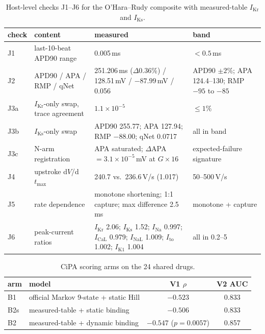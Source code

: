 \documentclass[11pt,a4paper]{article}
\begin{document}
\begin{table}[htbp]\centering\small
\caption{Host-level checks J1--J6 for the O'Hara--Rudy composite with
measured-table $I_{\mathrm{Kr}}$ and $I_{\mathrm{Ks}}$.}
\label{tab:hostchecks}
\begin{tabular}{@{}p{2.2cm}p{4.4cm}p{5.6cm}p{3.4cm}@{}}
\toprule
check & content & measured & band \\
\midrule
J1 & last-10-beat APD90 range & 0.005\,ms & $<0.5$\,ms \\
J2 & APD90 / APA / RMP / qNet & 251.206\,ms ($\Delta$0.36\%) / 128.51\,mV / $-87.99$\,mV / 0.056 & APD90 $\pm2$\%; APA 124.4--130; RMP $-95$ to $-85$ \\
J3a & $I_{\mathrm{Kr}}$-only swap, trace agreement & $1.1\times10^{-5}$ & $\le1$\% \\
J3b & $I_{\mathrm{Ks}}$-only swap & APD90 255.77; APA 127.94; RMP $-88.00$; qNet 0.0717 & all in band \\
J3c & N-arm registration & APA saturated; $\Delta$APA $=3.1\times10^{-5}$\,mV at $G\times16$ & expected-failure signature \\
J4 & upstroke d$V$/d$t_{\max}$ & 240.7 vs.\ 236.6\,V/s (1.017) & 50--500\,V/s \\
J5 & rate dependence & monotone shortening; 1:1 capture; max difference 2.5\,ms & monotone + capture \\
J6 & peak-current ratios & $I_{\mathrm{Kr}}$ 2.06; $I_{\mathrm{Ks}}$ 1.52; $I_{\mathrm{Na}}$ 0.997; $I_{\mathrm{CaL}}$ 0.979; $I_{\mathrm{NaL}}$ 1.009; $I_{\mathrm{to}}$ 1.002; $I_{\mathrm{K1}}$ 1.004 & all in 0.2--5 \\
\bottomrule
\end{tabular}
\end{table}

\begin{table}[htbp]\centering\small
\caption{CiPA scoring arms on the 24 shared drugs.}
\begin{tabular}{@{}llcc@{}}
\toprule
arm & model & V1 $\rho$ & V2 AUC \\
\midrule
B1 & official Markov 9-state + static Hill & $-0.523$ & 0.833 \\
B2s & measured-table + static binding & $-0.506$ & 0.833 \\
B2 & measured-table + dynamic binding & $-0.547$ ($p=0.0057$) & 0.857 \\
\bottomrule
\end{tabular}
\label{tab:cipaarms}
\end{table}
\end{document}
